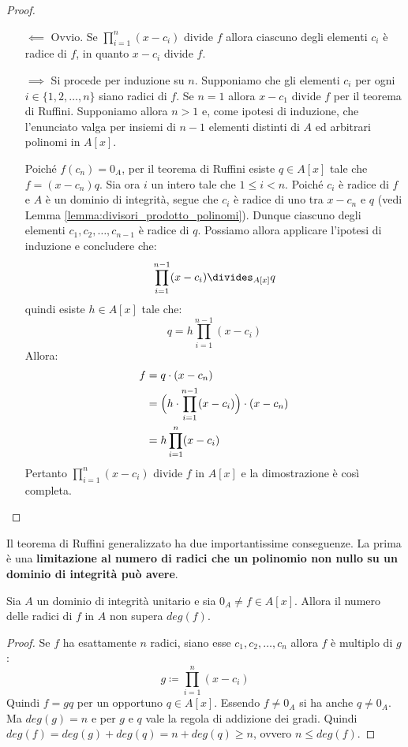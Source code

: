 \begin{proof}
\begin{itemize}
	\item[$\impliedby$] Ovvio. Se $\prod_{i=1}^{n}(x-c_{i})$ divide $f$ allora ciascuno degli elementi $c_{i}$ è radice di $f$, in quanto $x-c_{i}$ divide $f$.
	
	\item[$\implies$] Si procede per induzione su $n$. Supponiamo che gli elementi $c_{i}$ per ogni $i \in \{1,2,\ldots,n\}$ siano radici di $f$. Se $n=1$ allora $x-c_{1}$ divide $f$ per il teorema di Ruffini. Supponiamo allora $n>1$ e, come ipotesi di induzione, che l'enunciato valga per insiemi di $n-1$ elementi distinti di $A$ ed arbitrari polinomi in $A[x]$.
	
	Poiché $f(c_{n}) = 0_{A}$, per il teorema di Ruffini esiste $q \in A[x]$ tale che $f=(x-c_{n})q$. Sia ora $i$ un intero tale che $1 \leq i < n$. Poiché $c_{i}$ è radice di $f$ e $A$ è un dominio di integrità, segue che $c_{i}$ è radice di uno tra $x-c_{n}$ e $q$ (vedi Lemma \ref{lemma:divisori_prodotto_polinomi}). Dunque ciascuno degli elementi $c_{1},c_{2},\ldots, c_{n-1}$ è radice di $q$. Possiamo allora applicare l'ipotesi di induzione e concludere che: $$\prod_{i=1}^{n-1}(x-c_{i}) \divides_{A[x]} q$$ quindi esiste $h \in A[x]$ tale che:
	\begin{displaymath}
		q = h \prod_{i=1}^{n-1}(x-c_{i})
	\end{displaymath}
	Allora:
	\begin{align*}
		f &= q \cdot (x-c_{n}) \\
		  &= \Bigl( h \cdot \prod_{i=1}^{n-1}(x-c_{i})\Bigr) \cdot (x-c_{n}) \\
		  &= h \prod_{i=1}^{n}(x-c_{i})
	\end{align*}
	Pertanto $\prod_{i=1}^{n}(x-c_{i})$ divide $f$ in $A[x]$ e la dimostrazione è così completa.
\end{itemize}
\end{proof}

Il teorema di Ruffini generalizzato ha due importantissime conseguenze. La prima è una \textbf{limitazione al numero di radici che un polinomio non nullo su un dominio di integrità può avere}.

\begin{teorbox}\label{thm:grado_polinomio}
	Sia $A$ un dominio di integrità unitario e sia $0_{A} \neq f \in A[x]$. Allora il numero delle radici di $f$ in $A$ non supera $deg(f)$.
\end{teorbox}
\begin{proof}
	Se $f$ ha esattamente $n$ radici, siano esse $c_{1},c_{2},\ldots,c_{n}$ allora $f$ è multiplo di $g$:
	\begin{displaymath}
		g \coloneqq \prod_{i=1}^{n}(x-c_{i})
	\end{displaymath}
	Quindi $f = gq$ per un opportuno $q \in A[x]$. Essendo $f\neq 0_{A}$ si ha anche $q \neq 0_{A}$. Ma $deg(g) =n$ e per $g$ e $q$ vale la regola di addizione dei gradi. Quindi $deg(f) = deg(g) + deg (q) = n + deg (q) \geq n$, ovvero $n \leq deg(f)$.
\end{proof}


